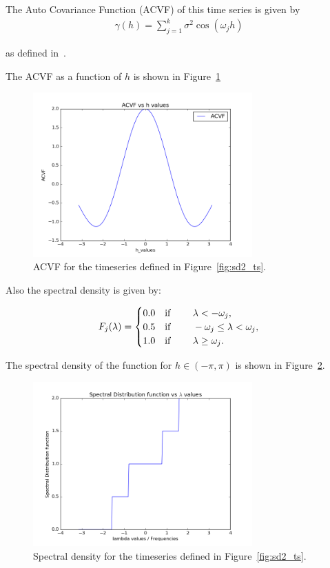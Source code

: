 \documentclass{article}
\begin{document}
The Auto Covariance Function (ACVF) of this time series is given by
\begin{align}
  \gamma(h) = \sum_{j=1}^{k} \sigma^{2}\cos(\omega_{j}h)
\end{align}

as defined in~\cite{itsf}. 

The ACVF as a function of $h$ is shown in Figure~\ref{fig:sd2_acvf}

\begin{figure}[ht!]
  \centering
  \includegraphics[width=0.75\textwidth]{images/spectral_density_2/acvf}
  \caption{ACVF for the timeseries defined in Figure~\ref{fig:sd2_ts}.\label{fig:sd2_acvf}}
\end{figure}

Also the spectral density is given by:

\begin{align}
  F_{j}(\lambda) = \begin{cases}
    0.0 & \text{if \qquad } \lambda < -\omega_{j},\\
    0.5 & \text{if \qquad } -\omega_{j} \le \lambda < \omega_{j},\\
    1.0 & \text{if \qquad } \lambda \ge \omega_{j}.
  \end{cases}
\end{align}

The spectral density of the function for $h \in (-\pi, \pi)$ is shown in Figure~\ref{fig:sd2_sd}.

\begin{figure}[ht!]
  \centering
  \includegraphics[width=0.75\textwidth]{images/spectral_density_2/sd}
  \caption{Spectral density for the timeseries defined in Figure~\ref{fig:sd2_ts}.\label{fig:sd2_sd}}
\end{figure}
\end{document}

